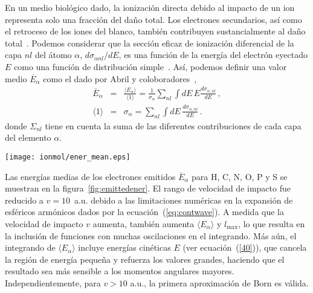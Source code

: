 En un medio biológico dado, la ionización directa debido al impacto de
un ion representa solo una fracción del daño total. Los electrones
secundarios, así como el retroceso de los iones del blanco, también
contribuyen sustancialmente al daño total~\cite{Denifl2011}. 
Podemos considerar que la sección eficaz de ionización diferencial de la
capa $nl$ del átomo $\alpha$, $d\sigma_{\alpha nl}/dE$, es una función 
de la energía del electrón eyectado $E$ como una función de distribución
simple~\cite{surdutovic2018}. Así, podemos definir una valor medio 
$\overline{E}_{\alpha}$ como el dado por Abril y coloboradores~\cite{abril2015},
\begin{eqnarray}
\overline{E}_{\alpha} &=&\frac{\langle E_{\alpha}\rangle}{\langle
1\rangle}=\frac{1}{\sigma_{\alpha}}\sum\limits_{nl}\int dE\,E
\frac{d\sigma_{\alpha,nl}}{dE}\,,  
\label{40} \\
\langle 1\rangle &=&\sigma_{\alpha}=\sum\limits_{nl}\int dE\,
\frac{d\sigma_{\alpha,nl}}{dE}\,. 
\label{50}
\end{eqnarray}
donde $\Sigma_{nl}$ tiene en cuenta la suma de las diferentes 
contribuciones de cada capa del elemento $\alpha$.

\begin{figure*}[t!]
\centering
\texttt{[image: ionmol/ener\_mean.eps]}
\caption[Distribución energética media de electrones emitidos.]
{Distribución energética media de electrones emitidos por ionización 
debido al impacto de iones cargados dado por la ecuación~(\ref{40}). 
La línea punteada corresponde a la aproximación de Born con $Z=1$.
La línea discontinua y las líneas sólidas hacen referencia a $\bar{p}$ e 
iones de carga $+1$, $+2$, $+4$, $+6$ y $+8$, respectivamente.}
\label{fig:emittedener}
\end{figure*} 

Las energías medias de los electrones emitidos $\overline{E}_{\alpha}$ 
para H, C, N, O, P y S se muestran en la figura~\ref{fig:emittedener}. 
El rango de velocidad de impacto fue reducido a $v=10$~a.u. debido 
a las limitaciones numéricas en la expansión de esféricos armónicos dados
por la ecuación~(\ref{eq:contwave}). A medida que la velocidad de 
impacto $v$ aumenta, también aumenta $\langle E_{\alpha}\rangle$ y
$l_{\max}$, lo que resulta en la inclusión de funciones con muchas 
oscilaciones en el integrando. Más aún, el integrando de 
$\langle E_{\alpha}\rangle$ incluye energías cinéticas $E$
(ver ecuación~(\ref{40})), que cancela la región de energía pequeña y 
refuerza los valores grandes, haciendo que el resultado sea más 
sensible a los momentos angulares mayores. Independientemente, para 
$v>10$ a.u., la primera aproximación de Born es válida. 


